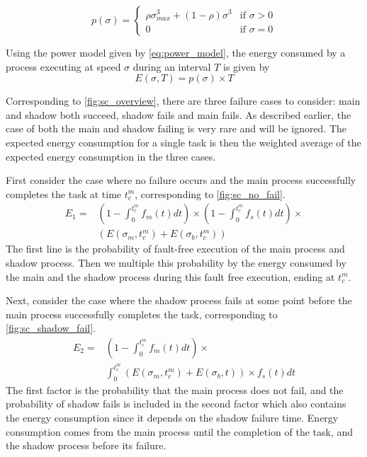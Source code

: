 \begin{equation}
p(\sigma) = \begin{cases} \rho \sigma_{max}^3 + (1-\rho) \sigma^3 & \mbox{if } \sigma > 0 \\ 
                          0 & \mbox{if } \sigma = 0 \end{cases}
\label{eq:power_model}
\end{equation}

Using the power model given by \ref{eq:power_model}, the
energy consumed by a process executing at speed $\sigma$ during an
interval $T$ is given by
\begin{equation}
E(\sigma,T) = p(\sigma) \times T
\end{equation}

Corresponding to \ref{fig:sc_overview}, there are three
failure cases to consider: main and shadow both succeed, shadow fails
and main fails. As described earlier, the case of both the main and
shadow failing is very rare and will be ignored. The expected
energy consumption for a single task is then the weighted average of
the expected energy consumption in the three cases.

First consider the case where no failure occurs and the main process
successfully completes the task at time $t_c^m$, corresponding to
\ref{fig:sc_no_fail}.
\begin{equation}
\begin{split}
E_1 = &  ( 1-\int_0^{t_c^m}f_m(t)dt) \times (1 - \int_0^{t_c^m} f_s(t)dt) \times \\
      &  (  E(\sigma_m,t_c^m) + E(\sigma_b,t_c^m))
\label{eq:energy_no_failure}
\end{split}
\end{equation}
The first line is the probability of fault-free execution of the main
process and shadow process. Then we multiple this probability by the
energy consumed by the main and the shadow process during this fault
free execution, ending at $t_c^m$.

Next, consider the case where the shadow process fails at some point
before the main process successfully completes the task, corresponding to
\ref{fig:sc_shadow_fail}.
\begin{equation}
\begin{split}
E_2 = & (1-\int_0^{t_c^m}f_m(t)dt) \times \\
      & \int_0^{t_c^m}(E(\sigma_m,t_c^m)+E(\sigma_b,t)) \times f_s(t)dt
\label{eq:energy_shadow_fail}
\end{split}
\end{equation}
The first factor is the probability that the main process does not
fail, and the probability of shadow fails is included in the second factor which also contains the energy consumption since it depends on the shadow failure time. Energy consumption comes from the main process until the completion of the task,
and the shadow process before its failure.

